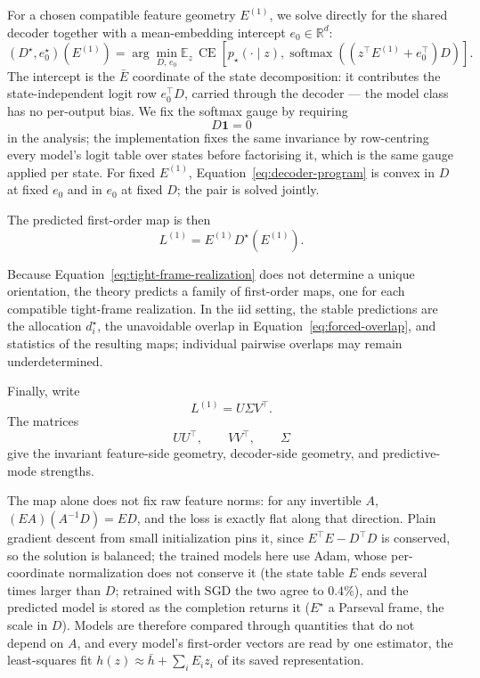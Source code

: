 For a chosen compatible feature geometry \(E^{(1)}\), we solve directly for the
shared decoder together with a mean-embedding intercept
\(e_0\in\mathbb R^d\):
\begin{equation}
\boxed{
\left(D^\star,e_0^\star\right)(E^{(1)})
=
\arg\min_{D,\,e_0}
\mathbb E_z\,
\operatorname{CE}
\left[
p_\star(\cdot\mid z),
\operatorname{softmax}
\left(
\left(z^\top E^{(1)}+e_0^\top\right)D
\right)
\right].
}
\label{eq:decoder-program}
\end{equation}
The intercept is the \(\bar E\) coordinate of the state decomposition: it
contributes the state-independent logit row \(e_0^\top D\), carried through the
decoder — the model class has no per-output bias. We fix the softmax gauge by
requiring
\[
D\mathbf 1=0
\]
in the analysis; the implementation fixes the same invariance by row-centring every
model's logit table over states before factorising it, which is the same gauge applied
per state.
For fixed \(E^{(1)}\), Equation~\eqref{eq:decoder-program} is convex in \(D\) at
fixed \(e_0\) and in \(e_0\) at fixed \(D\); the pair is solved jointly.

The predicted first-order map is then
\begin{equation}
\boxed{
L^{(1)}
=
E^{(1)}D^\star(E^{(1)}).
}
\label{eq:predicted-first-order-map}
\end{equation}

Because Equation~\eqref{eq:tight-frame-realization} does not determine a unique
orientation, the theory predicts a family of first-order maps, one for each
compatible tight-frame realization. In the iid setting, the stable predictions are
the allocation \(d_i^\star\), the unavoidable overlap in
Equation~\eqref{eq:forced-overlap}, and statistics of the resulting maps; individual
pairwise overlaps may remain underdetermined.

Finally, write
\[
L^{(1)}=U\Sigma V^\top.
\]
The matrices
\[
UU^\top,\qquad VV^\top,\qquad \Sigma
\]
give the invariant feature-side geometry, decoder-side geometry, and predictive-mode
strengths.

The map alone does not fix raw feature norms: for any invertible \(A\),
\((EA)(A^{-1}D)=ED\), and the loss is exactly flat along that direction. Plain
gradient descent from small initialization pins it, since \(E^\top E-D^\top D\) is
conserved, so the solution is balanced; the trained models here use Adam, whose
per-coordinate normalization does not conserve it (the state table \(E\) ends several
times larger than \(D\); retrained with SGD the two agree to \(0.4\%\)), and the
predicted model is stored as the completion returns it (\(E^\star\) a Parseval frame,
the scale in \(D\)). Models are therefore compared through quantities that do not
depend on \(A\), and every model's first-order vectors are read by one estimator, the
least-squares fit \(h(z)\approx\bar h+\sum_iE_iz_i\) of its saved representation.

